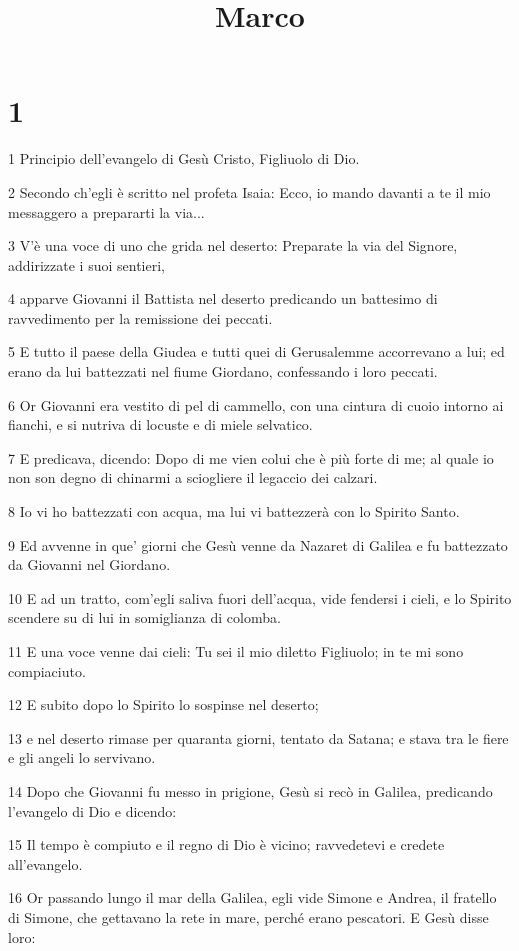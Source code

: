 

\title{Marco}


\chapter{1}

\par 1 Principio dell'evangelo di Gesù Cristo, Figliuolo di Dio.
\par 2 Secondo ch'egli è scritto nel profeta Isaia: Ecco, io mando davanti a te il mio messaggero a prepararti la via...
\par 3 V'è una voce di uno che grida nel deserto: Preparate la via del Signore, addirizzate i suoi sentieri,
\par 4 apparve Giovanni il Battista nel deserto predicando un battesimo di ravvedimento per la remissione dei peccati.
\par 5 E tutto il paese della Giudea e tutti quei di Gerusalemme accorrevano a lui; ed erano da lui battezzati nel fiume Giordano, confessando i loro peccati.
\par 6 Or Giovanni era vestito di pel di cammello, con una cintura di cuoio intorno ai fianchi, e si nutriva di locuste e di miele selvatico.
\par 7 E predicava, dicendo: Dopo di me vien colui che è più forte di me; al quale io non son degno di chinarmi a sciogliere il legaccio dei calzari.
\par 8 Io vi ho battezzati con acqua, ma lui vi battezzerà con lo Spirito Santo.
\par 9 Ed avvenne in que' giorni che Gesù venne da Nazaret di Galilea e fu battezzato da Giovanni nel Giordano.
\par 10 E ad un tratto, com'egli saliva fuori dell'acqua, vide fendersi i cieli, e lo Spirito scendere su di lui in somiglianza di colomba.
\par 11 E una voce venne dai cieli: Tu sei il mio diletto Figliuolo; in te mi sono compiaciuto.
\par 12 E subito dopo lo Spirito lo sospinse nel deserto;
\par 13 e nel deserto rimase per quaranta giorni, tentato da Satana; e stava tra le fiere e gli angeli lo servivano.
\par 14 Dopo che Giovanni fu messo in prigione, Gesù si recò in Galilea, predicando l'evangelo di Dio e dicendo:
\par 15 Il tempo è compiuto e il regno di Dio è vicino; ravvedetevi e credete all'evangelo.
\par 16 Or passando lungo il mar della Galilea, egli vide Simone e Andrea, il fratello di Simone, che gettavano la rete in mare, perché erano pescatori. E Gesù disse loro:
